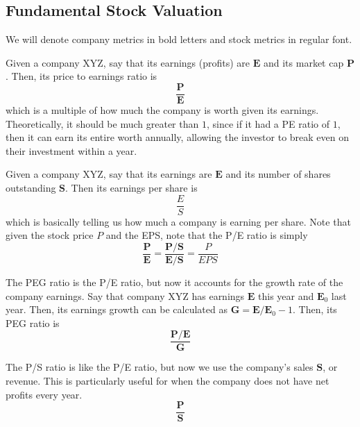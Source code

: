 \documentclass{article}
\begin{document}
  \subsection{Fundamental Stock Valuation}

    We will denote company metrics in bold letters and stock metrics in regular font. 

    \begin{definition}[P/E Ratio]
    Given a company XYZ, say that its earnings (profits) are $\mathbf{E}$ and its market cap $\mathbf{P}$. Then, its price to earnings ratio is 
    \[\frac{\mathbf{P}}{\mathbf{E}}\]
    which is a multiple of how much the company is worth given its earnings. Theoretically, it should be much greater than $1$, since if it had a PE ratio of $1$, then it can earn its entire worth annually, allowing the investor to break even on their investment within a year. 
    \end{definition}

    \begin{definition}
    Given a company XYZ, say that its earnings are $\mathbf{E}$ and its number of shares outstanding $\mathbf{S}$. Then its earnings per share is 
    \[\frac{E}{S}\]
    which is basically telling us how much a company is earning per share. Note that given the stock price $P$ and the EPS, note that the P/E ratio is simply 
    \[\frac{\mathbf{P}}{\mathbf{E}} = \frac{\mathbf{P} / \mathbf{S}}{\mathbf{E} / \mathbf{S}} = \frac{P}{EPS}\]
    \end{definition}

    \begin{definition}
    The PEG ratio is the P/E ratio, but now it accounts for the growth rate of the company earnings. Say that company XYZ has earnings $\mathbf{E}$ this year and $\mathbf{E}_0$ last year. Then, its earnings growth can be calculated as $\mathbf{G} = \mathbf{E}/\mathbf{E}_0 - 1$. Then, its PEG ratio is 
    \[\frac{\mathbf{P}/\mathbf{E}}{\mathbf{G}}\]
    \end{definition}

    \begin{definition}[P/S Ratio]
    The P/S ratio is like the P/E ratio, but now we use the company's sales $\mathbf{S}$, or revenue. This is particularly useful for when the company does not have net profits every year. 
    \[\frac{\mathbf{P}}{\mathbf{S}}\]
    \end{definition}

    \begin{definition}[ROIC]

    \end{definition}
\end{document}
